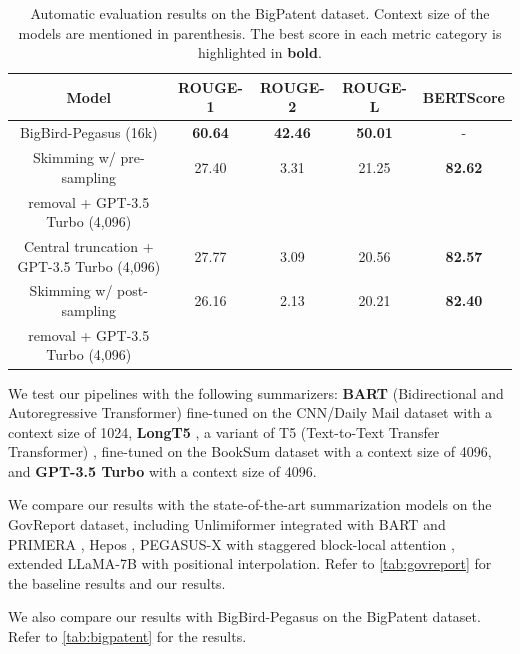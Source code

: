 \begin{table}[!ht]
	\centering

	\begin{tabular}{c c c c c}
		\hline
		Model & ROUGE-1 & ROUGE-2 & ROUGE-L & BERTScore \\
		\hline
		BigBird-Pegasus (16k) & \textbf{60.64} & \textbf{42.46} & \textbf{50.01} & - \\
		\hline
		Skimming w/ pre-sampling & 27.40 & 3.31 & 21.25 & \textbf{82.62} \\
		removal + GPT-3.5 Turbo (4,096) & & & & \\
		Central truncation + GPT-3.5 Turbo (4,096) & 27.77 & 3.09 & 20.56 & \textbf{82.57} \\
		Skimming w/ post-sampling & 26.16 & 2.13 & 20.21 & \textbf{82.40} \\
		removal + GPT-3.5 Turbo (4,096) & & & & \\
		\hline
	\end{tabular}

	\caption{Automatic evaluation results on the BigPatent dataset. Context size of the models are
	mentioned in parenthesis. The best score in each metric category is highlighted in \textbf{bold}.}
	\label{tab:bigpatent}
\end{table}

We test our pipelines with the following summarizers: \textbf{BART} (Bidirectional
and Autoregressive Transformer) \cite{lewis-etal-2020-bart} fine-tuned on the
CNN/Daily Mail dataset \cite{nallapati2016abstractive} with a context size of 1024,
\textbf{LongT5} \cite{guo2021longt5}, a variant of T5 (Text-to-Text Transfer
Transformer) \cite{raffel2020exploring}, fine-tuned on the BookSum dataset with
a context size of 4096, and \textbf{GPT-3.5 Turbo} \cite{brown2020language} with a
context size of 4096.

We compare our results with the state-of-the-art summarization models on the GovReport dataset,
including Unlimiformer \cite{bertsch2023unlimiformer} integrated with BART \cite{lewis-etal-2020-bart}
and PRIMERA \cite{beltagy2020longformer}, Hepos \cite{huang-etal-2021-efficient},
PEGASUS-X with staggered block-local attention \cite{phang2022investigating}, extended
LLaMA-7B with positional interpolation.
Refer to \autoref{tab:govreport} for the baseline results and our results.

We also compare our results with BigBird-Pegasus \cite{zaheer2020big} on the BigPatent dataset.
Refer to \autoref{tab:bigpatent} for the results.

